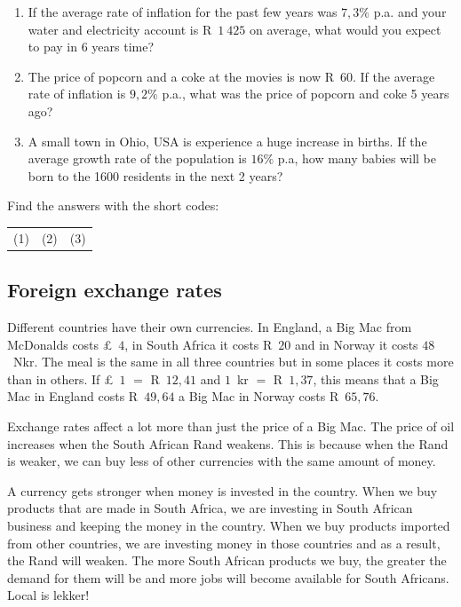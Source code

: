 \begin{exercises}{}{
    \begin{enumerate}[label=\textbf{\arabic*}.]
	\item If the average rate of inflation for the past few years was $7,3\%$ p.a. and your water and electricity account is R~$1~425$ on average, what would you expect to pay in 6 years time?

	\item The price of popcorn and a coke at the movies is now R~$60$. If the average rate of inflation is $9,2\%$ p.a., what was the price of popcorn and coke 5 years ago?

	\item A small town in Ohio, USA is experience a huge increase in births. If the average growth rate of the population is $16\%$ p.a, how many babies will be born to the 1600 residents in the next 2 years?\\
    \end{enumerate}

    Find the answers with the short codes:\\
    \begin{tabularx}{\textwidth}{ XXX }
	(1)	&	(2)	&	(3)\\
    \end{tabularx}
}
\end{exercises}



\subsection{Foreign exchange rates}

Different countries have their own currencies. In England, a Big Mac from McDonalds costs £~$4$, in South Africa it costs R~$20$ and in Norway it costs $48$~Nkr. The meal is the same in all three countries but in some places it costs more than in others. If £~$1$ $=$ R~$12,41$ and $1$~kr $=$ R~$1,37$, this means that a Big Mac in England costs R~$49,64$ a Big Mac in Norway costs R~$65,76$.\par

Exchange rates affect a lot more than just the price of a Big Mac. The price of oil increases when the South African Rand weakens. This is because when the Rand is weaker, we can buy less of other currencies with the same amount of money.\par

A currency gets stronger when money is invested in the country. When we buy products that are made in South Africa, we are investing in South African business and keeping the money in the country. When we buy products imported from other countries, we are investing money in those countries and as a result, the Rand will weaken. The more South African products we buy, the greater the demand for them will be and more jobs will become available for South Africans. Local is lekker!


